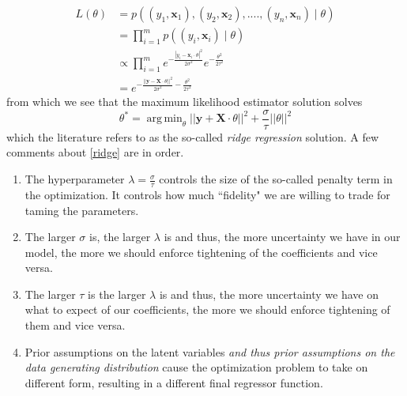 \documentclass[12pt]{article}
\newcommand{\x}{\mathbf{x}}
\DeclareMathOperator*{\argmin}{arg\,min}
\begin{document}
\begin{align*}
L(\theta) &= p((y_1, \x_1), (y_2, \x_2), ...., (y_n, \x_n) \mid  \theta)\\
&=\prod_{i=1}^m p((y_i, \x_i) \mid \theta)\\
&\propto \prod_{i=1}^m e^{-\frac{|y_i - \x_i \cdot \theta|^2}{2\sigma^2}}e^{-\frac{\theta^2}{2\tau^2}}\\
&=  e^{-\frac{||\mathbf{y} - \mathbf{X} \cdot \theta||^2}{2\sigma^2} -\frac{\theta^2}{2\tau^2} }
\end{align*}
from which we see that the maximum likelihood estimator solution solves 
\begin{equation}
\label{ridge}
\theta^* = \argmin_\theta ||\mathbf{y} + \mathbf{X} \cdot \theta||^2 + \frac{\sigma}{\tau}||\theta||^2
\end{equation}
which the literature refers to as the so-called {\it ridge regression} solution. 
A few comments about \eqref{ridge} are in order. 
\begin{enumerate}
\item The hyperparameter $\lambda = \frac{\sigma}{\tau}$ controls the size of the so-called penalty term in the optimization. It controls how much ``fidelity" we are willing to trade for taming the parameters. 
\item The larger $\sigma$ is, the larger $\lambda$ is and thus, the more uncertainty we have in our model, the more we should enforce tightening of the coefficients and vice versa. 
\item The larger $\tau$ is the larger $\lambda$ is and thus, the more uncertainty we have on what to expect of our coefficients, the more we should enforce tightening of them and vice versa.  
\item Prior assumptions on the latent variables {\it and thus prior assumptions on the data generating distribution} cause the optimization problem to take on different form, resulting in a different final regressor function. 
\end{enumerate}
\end{document}
